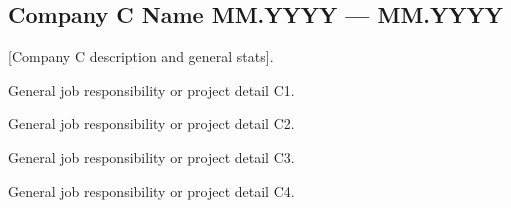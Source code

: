 \subsection{{Company C Name \hfill MM.YYYY --- MM.YYYY}}

[Company C description and general stats].

\begin{zitemize}
  \item General job responsibility or project detail C1.
  \item General job responsibility or project detail C2.
  \item General job responsibility or project detail C3.
  \item General job responsibility or project detail C4.
\end{zitemize}
